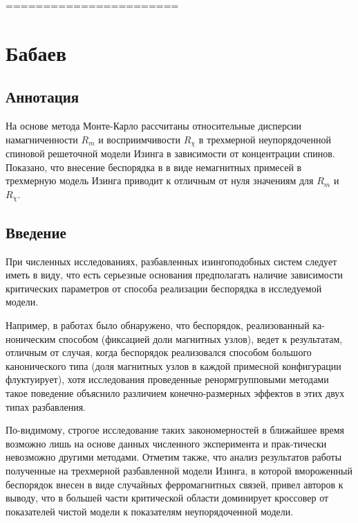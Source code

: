 

=======================




\section{Бабаев}






\subsection{Аннотация}


На основе метода Монте-Карло рассчитаны относительные дисперсии намагниченности  $R_m$ и восприимчивости $R_\chi$  в трехмерной неупорядоченной спиновой решеточной модели Изинга в зависимости от концентрации спинов. Показано, что внесение беспорядка в в виде немагнитных примесей в трехмерную модель Изинга приводит к отличным от нуля значениям для $R_m$ и $R_\chi$.




\subsection{Введение}

При численных исследованиях, разбавленных изингоподобных систем следует иметь в виду, что есть серьезные основания предполагать наличие зависимости критических параметров от способа реализации беспорядка в исследуемой модели. 

Например, в работах \cite{ph2_1,ph2_2} было обнаружено, что беспорядок, реализованный ка-ноническим способом (фиксацией доли магнитных узлов), ведет к результатам, отличным от случая, когда беспорядок реализовался способом большого канонического типа (доля магнитных узлов в каждой примесной конфигурации флуктуирует), хотя исследования \cite{ph2_3} проведенные ренормгрупповыми методами такое поведение объяснило различием конечно-размерных эффектов в этих двух типах разбавления.

По-видимому, строгое исследование таких закономерностей в ближайшее время возможно лишь на основе данных численного эксперимента и прак-тически невозможно другими методами. Отметим также, что анализ результатов работы \cite{ph2_4} полученные на трехмерной разбавленной модели Изинга, в которой вмороженный беспорядок внесен в виде случайных ферромагнитных связей, привел авторов к выводу, что в большей части критической области доминирует кроссовер от показателей чистой модели к показателям неупорядоченной модели.

